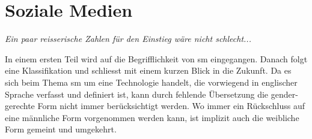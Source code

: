 %
%

\chapter{Soziale Medien}\label{chap.sm}
\glsresetall
\textit{Ein paar reisserische Zahlen für den Einstieg wäre nicht schlecht...}\par 

In einem ersten Teil wird auf die Begrifflichkeit von \gls{sm} eingegangen. Danach folgt eine Klassifikation und schliesst mit einem kurzen Blick in die Zukunft.\newline
Da es sich beim Thema \gls{sm} um eine Technologie handelt, die vorwiegend in englischer Sprache verfasst und definiert ist, kann durch fehlende Übersetzung die gender-gerechte Form nicht immer berücksichtigt werden. Wo immer ein Rückschluss auf eine männliche Form vorgenommen werden kann, ist implizit auch die weibliche Form gemeint und umgekehrt.
